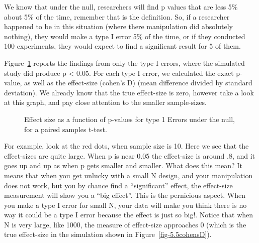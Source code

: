 \documentclass[
  letterpaper,
  DIV=11,
  numbers=noendperiod]{scrreprt}
\begin{document}
We know that under the null, researchers will find p values that are
less 5\% about 5\% of the time, remember that is the definition. So, if
a researcher happened to be in this situation (where there manipulation
did absolutely nothing), they would make a type I error 5\% of the time,
or if they conducted 100 experiments, they would expect to find a
significant result for 5 of them.

Figure~\ref{fig-5.5effectsizeType1} reports the findings from only the
type I errors, where the simulated study did produce p \textless{} 0.05.
For each type I error, we calculated the exact p-value, as well as the
effect-size (cohen's D) (mean difference divided by standard deviation).
We already know that the true effect-size is zero, however take a look
at this graph, and pay close attention to the smaller sample-sizes.

\begin{figure}


\caption{\label{fig-5.5effectsizeType1}Effect size as a function of
p-values for type 1 Errors under the null, for a paired samples t-test.}

\end{figure}%

For example, look at the red dots, when sample size is 10. Here we see
that the effect-sizes are quite large. When p is near 0.05 the
effect-size is around .8, and it goes up and up as when p gets smaller
and smaller. What does this mean? It means that when you get unlucky
with a small N design, and your manipulation does not work, but you by
chance find a ``significant'' effect, the effect-size measurement will
show you a ``big effect''. This is the pernicious aspect. When you make
a type I error for small N, your data will make you think there is no
way it could be a type I error because the effect is just so big!.
Notice that when N is very large, like 1000, the measure of effect-size
approaches 0 (which is the true effect-size in the simulation shown in
Figure~\ref{fig-5.5cohensD}).
\end{document}
